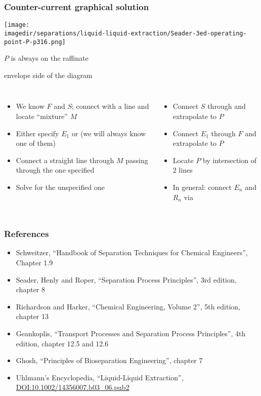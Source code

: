 \begin{frame}\frametitle{Counter-current graphical solution}

	\begin{center}
		\texttt{[image: \\imagedir/separations/liquid-liquid-extraction/Seader-3ed-operating-point-P-p316.png]}
	\end{center}
	
	\vspace{-3cm}
	\hfill {\small $P$ is always on the raffinate}
	
	\hfill {\small envelope side of the diagram}
	\vspace{2cm}
	\begin{columns}[t]
		\vspace{-18pt}
		{\scriptsize
			\begin{itemize}
				\item	We know $F$ and $S$; connect with a line and locate ``mixture'' $M$
				\item	Either specify $E_1$ or {\color{myRed}{$R_N$}} (we will always know one of them)
				\item	Connect a straight line through $M$ passing through the one specified
				\item	Solve for the unspecified one
			\end{itemize}}
		\vspace{-18pt}
		{\scriptsize	
			\begin{itemize}
				\item	Connect $S$ through {\color{myRed}{$R_N$}} and extrapolate to $P$
				\item	Connect $E_1$ through $F$ and extrapolate to $P$
				\item	Locate $P$ by intersection of 2 lines
				\item	In general: connect $E_n$ and $R_n$ via {\color{myOrange}{equilibrium tie lines}}
			\end{itemize}}
	\end{columns}
\end{frame}

\begin{frame}\frametitle{References}
	\begin{itemize}
		\item	Schweitzer, ``Handbook of Separation Techniques for Chemical Engineers'', Chapter 1.9
		\item	Seader, Henly and Roper, ``Separation Process Principles'', 3rd edition, chapter 8
		\item	Richardson and Harker, ``Chemical Engineering, Volume 2'', 5th edition, chapter 13
		\item	Geankoplis, ``Transport Processes and Separation Process Principles'', 4th edition, chapter 12.5 and 12.6
		\item	Ghosh, ``Principles of Bioseparation Engineering'', chapter 7
		\item	Uhlmann's Encyclopedia, ``Liquid-Liquid Extraction'',  \href{http://dx.doi.org/10.1002/14356007.b03\_06.pub2}{DOI:10.1002/14356007.b03\_06.pub2}
	\end{itemize}
\end{frame}

